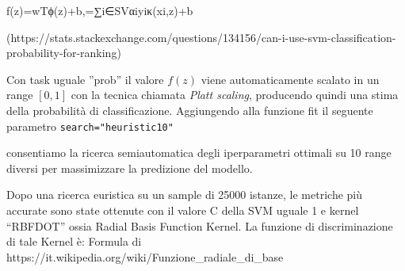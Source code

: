 f(z)=wTϕ(z)+b,=∑i∈SVαiyiκ(xi,z)+b 

(https://stats.stackexchange.com/questions/134156/can-i-use-svm-classification-probability-for-ranking)


Con task uguale ”prob” il valore $f(z)$ viene automaticamente scalato in un range $[0, 1]$ con la tecnica chiamata \textit{Platt scaling}, producendo quindi una stima della probabilità di classificazione.
Aggiungendo alla funzione fit il seguente parametro \texttt{search="heuristic10"}

consentiamo la ricerca semiautomatica degli iperparametri ottimali su 10 range diversi per massimizzare la predizione del modello.

Dopo una ricerca euristica su un sample di 25000 istanze, le metriche più accurate sono state ottenute con il valore C della SVM uguale 1 e kernel “RBFDOT” ossia Radial Basis Function Kernel.
La funzione di discriminazione di tale Kernel è:
Formula di https://it.wikipedia.org/wiki/Funzione_radiale_di_base

